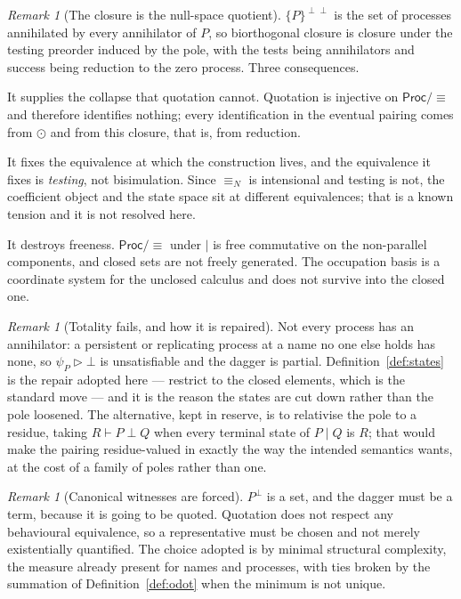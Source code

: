 \documentclass[11pt]{article}
\theoremstyle{definition}
\theoremstyle{remark}
\newtheorem{remark}[theorem]{Remark}
\newcommand{\Proc}{\mathsf{Proc}}
\newcommand{\scong}{\ensuremath{\equiv}}
\newcommand{\nameq}{\ensuremath{\equiv_{N}}}
\begin{document}
\begin{remark}[The closure is the null-space quotient]
\label{rem:closure}
$\{P\}^{\perp\perp}$ is the set of processes annihilated by every annihilator of
$P$, so biorthogonal closure is closure under the testing preorder induced by
the pole, with the tests being annihilators and success being reduction to the
zero process. Three consequences.

It supplies the collapse that quotation cannot. Quotation is injective on
$\Proc/\scong$ and therefore identifies nothing; every identification in the
eventual pairing comes from $\odot$ and from this closure, that is, from
reduction.

It fixes the equivalence at which the construction lives, and the equivalence it
fixes is \emph{testing}, not bisimulation. Since $\nameq$ is intensional and
testing is not, the coefficient object and the state space sit at different
equivalences; that is a known tension and it is not resolved here.

It destroys freeness. $\Proc/\scong$ under $\mid$ is free commutative on the
non-parallel components, and closed sets are not freely generated. The
occupation basis is a coordinate system for the unclosed calculus and does not
survive into the closed one.
\end{remark}

\begin{remark}[Totality fails, and how it is repaired]
\label{rem:totality}
Not every process has an annihilator: a persistent or replicating process at a
name no one else holds has none, so $\psi_P \rhd \bot$ is unsatisfiable and the
dagger is partial. Definition~\ref{def:states} is the repair adopted here ---
restrict to the closed elements, which is the standard move --- and it is the
reason the states are cut down rather than the pole loosened. The alternative,
kept in reserve, is to relativise the pole to a residue, taking $R \vdash P
\perp Q$ when every terminal state of $P \mid Q$ is $R$; that would make the
pairing residue-valued in exactly the way the intended semantics wants, at the
cost of a family of poles rather than one.
\end{remark}

\begin{remark}[Canonical witnesses are forced]
\label{rem:canonical}
$P^{\perp}$ is a set, and the dagger must be a term, because it is going to be
quoted. Quotation does not respect any behavioural equivalence, so a
representative must be chosen and not merely existentially quantified. The
choice adopted is by minimal structural complexity, the measure already present
for names and processes, with ties broken by the summation of
Definition~\ref{def:odot} when the minimum is not unique.
\end{remark}
\end{document}
